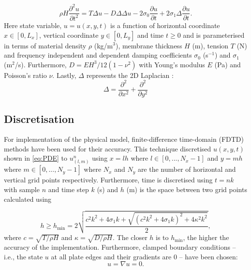 \documentclass{vgtc}
\begin{document}
\begin{equation}
\rho H\frac{\partial^2u}{\partial t^2} = T\Delta u - D\Delta\Delta u - 2 \sigma_0\frac{\partial u}{\partial t} + 2 \sigma_1 \Delta \frac{\partial u}{\partial t}.
\end{equation}
Here state variable, $u = u(x,y,t)$ is a function of horizontal coordinate $x \in [0, L_x]$, vertical coordinate $y \in [0, L_y]$ and time $t\geq0$ and is parameterised in terms of material density $\rho$ (kg/m$^3$), membrane thickness $H$ (m), tension $T$ (N) and frequency independent and dependent damping coefficients $\sigma_0$ (s$^{-1}$) and $\sigma_1$ (m$^2$/s). Furthermore, $D = EH^3/12(1-\nu^2)$ with Young's modulus $E$ (Pa) and Poisson's ratio $\nu$. Lastly, $\Delta$ represents the 2D Laplacian \cite{bilbao2009numerical}:
\begin{equation}\label{eq:PDE}
    \Delta = \frac{\partial^2}{\partial x^2} + \frac{\partial^2}{\partial y^2}
\end{equation}


\subsection{Discretisation}
For implementation of the physical model, finite-difference time-domain (FDTD) methods have been used for their accuracy. This technique discretised $u(x,y,t)$ shown in \autoref{eq:PDE} to $u_{(l,m)}^n$ using $x=lh$ where $l \in [0, ..., N_x-1]$ and $y=mh$ where $m \in [0, ..., N_y-1]$ where $N_x$ and $N_y$ are the number of horizontal and vertical grid points respectively. Furthermore, time is discretised using $t = nk$ with sample $n$ and time step $k$ (s) and $h$ (m) is the space between two grid points calculated using 

\begin{equation}\label{eq:h}
    h \geq h_\text{min} =  2\sqrt{\frac{c^2k^2 + 4\sigma_1k + \sqrt{(c^2k^2 + 4\sigma_1k)^2 + 4\kappa^2 k^2} }{2}},
\end{equation}
where $c = \sqrt{T/\rho H}$ and $\kappa = \sqrt{D/\rho H}$. The closer $h$ is to $h_\text{min}$, the higher the accuracy of the implementation. Furthermore, clamped boundary conditions -- i.e., the state $u$ at all plate edges and their gradients are 0 -- have been chosen:
\begin{equation}
    u = \nabla u = 0.
\end{equation}
\\
\end{document}
